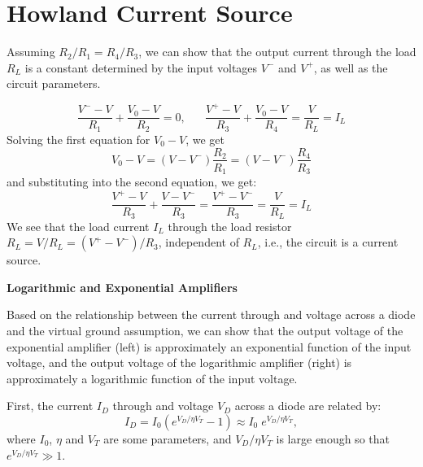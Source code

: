\documentclass{article}
\begin{document}
\section*{Howland Current Source}


  Assuming $R_2/R_1=R_4/R_3$, we can show that the output current
  through the load $R_L$ is a constant determined by the input
  voltages $V^-$ and $V^+$, as well as the circuit parameters.

  \begin{equation}
  \frac{V^--V}{R_1}+\frac{V_0-V}{R_2}=0,\;\;\;\;\;\;
  \frac{V^+-V}{R_3}+\frac{V_0-V}{R_4}=\frac{V}{R_L}=I_L
  \end{equation}
  Solving the first equation for $V_0-V$, we get
  \begin{equation}
  V_0-V=(V-V^-)\frac{R_2}{R_1}=(V-V^-)\frac{R_4}{R_3}
  \end{equation}
  and substituting into the second equation, we get:
  \begin{equation}
  \frac{V^+-V}{R_3}+\frac{V-V^-}{R_3}
  =\frac{V^+-V^-}{R_3}=\frac{V}{R_L}=I_L
  \end{equation}
  We see that the load current $I_L$ through the load resistor 
  $R_L=V/R_L=(V^+-V^-)/R_3$, independent of $R_L$, i.e., the circuit 
  is a current source.


  {\bf Logarithmic and Exponential Amplifiers}


  Based on the relationship between the current through and voltage 
  across a diode and the virtual ground assumption, we can show 
  that the output voltage of the exponential amplifier (left) is
  approximately an exponential function of the input voltage, and 
  the output voltage of the logarithmic amplifier (right) is 
  approximately a logarithmic function of the input voltage.
  
  First, the current $I_D$ through and voltage $V_D$ across a diode 
  are related by:
  \begin{equation}           
  I_D=I_0 \left( e^{V_D/\eta V_T}-1 \right)\approx I_0 \; e^{V_D/\eta V_T},
  \end{equation}        
  where $I_0$, $\eta$ and $V_T$ are some parameters, and $V_D/\eta V_T$ 
  is large enough so that $e^{V_D/\eta V_T}\gg 1$.    
\end{document}
